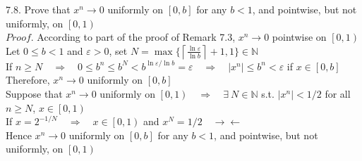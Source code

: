\documentclass[12pt]{book}
\begin{document}
\begin{CJK}{UTF8}{bsmi}
7.8. Prove that $x^n\rightarrow0$ uniformly on $\left[0, b\right]$ for any $b<1$, and pointwise, but not uniformly, on $\left[0, 1\right)$ \\
$Proof$. According to part of the proof of Remark 7.3, $x^n\rightarrow0$ pointwise on $\left[0, 1\right)$ \\
Let $0\le b<1$ and $\varepsilon>0$, set $\displaystyle N=\max\{\left \lceil \frac{\ln{\varepsilon}}{\ln{b}} \right \rceil +1, 1\}\in\mathbb{N}$ \\
If $n\ge N\quad\Rightarrow\quad 0\le b^n\le b^N<b^{\ln{\varepsilon}/\ln{b}}=\varepsilon\quad\Rightarrow\quad|x^n|\le b^n<\varepsilon$ if $x\in\left[0, b\right]$ \\
Therefore, $x^n\rightarrow 0$ uniformly on $\left[0, b\right]$ \\
Suppose that $x^n\rightarrow 0$ uniformly on $\left[0, 1\right)\quad\Rightarrow\quad\exists\ N\in\mathbb{N}$ s.t. $|x^n|<1/2$ for all $n\ge N$, $x\in\left[0, 1\right)$ \\
If $x=2^{-1/N}\quad\Rightarrow\quad x\in\left[0, 1\right)$ and $x^N=1/2\quad\rightarrow\leftarrow$ \\
Hence $x^n\rightarrow0$ uniformly on $\left[0, b\right]$ for any $b<1$, and pointwise, but not uniformly, on $\left[0, 1\right)$

\end{CJK}
\end{document}
